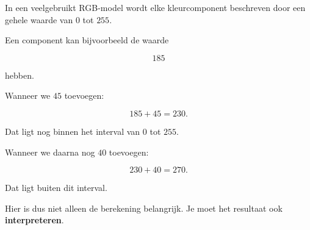 \documentclass{ximera}
\begin{document}

In een veelgebruikt RGB-model wordt elke kleurcomponent beschreven door een
gehele waarde van \(0\) tot \(255\).

Een component kan bijvoorbeeld de waarde

\[
185
\]

hebben.

Wanneer we \(45\) toevoegen:

\[
185+45=230.
\]

Dat ligt nog binnen het interval van \(0\) tot \(255\).

Wanneer we daarna nog \(40\) toevoegen:

\[
230+40=270.
\]

Dat ligt buiten dit interval.

Hier is dus niet alleen de berekening belangrijk.
Je moet het resultaat ook \textbf{interpreteren}.
\end{document}
